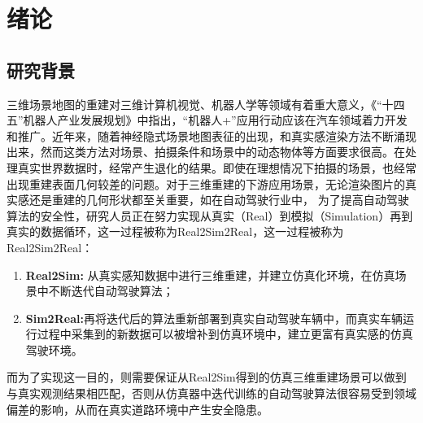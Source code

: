 %
%
%
%
%
%

\chapter{绪论}
\label{chapter:intro}

\section{研究背景}
三维场景地图的重建对三维计算机视觉、机器人学等领域有着重大意义，《“十四五”机器人产业发展规划》中指出，“机器人+”应用行动应该在汽车领域着力开发和推广。近年来，随着神经隐式场景地图表征的出现，和真实感渲染方法不断涌现出来，然而这类方法对场景、拍摄条件和场景中的动态物体等方面要求很高。在处理真实世界数据时，经常产生退化的结果。即使在理想情况下拍摄的场景，也经常出现重建表面几何较差的问题。对于三维重建的下游应用场景，无论渲染图片的真实感还是重建的几何形状都至关重要，如在自动驾驶行业中， 为了提高自动驾驶算法的安全性，研究人员正在努力实现从真实（Real）到模拟（Simulation）再到真实的数据循环，这一过程被称为Real2Sim2Real，这一过程被称为Real2Sim2Real：
\begin{enumerate}
    \item \textbf{Real2Sim:} 从真实感知数据中进行三维重建，并建立仿真化环境，在仿真场景中不断迭代自动驾驶算法；
    \item \textbf{Sim2Real:}再将迭代后的算法重新部署到真实自动驾驶车辆中，而真实车辆运行过程中采集到的新数据可以被增补到仿真环境中，建立更富有真实感的仿真驾驶环境。
\end{enumerate}

而为了实现这一目的，则需要保证从Real2Sim得到的仿真三维重建场景可以做到与真实观测结果相匹配，否则从仿真器中迭代训练的自动驾驶算法很容易受到领域偏差的影响，从而在真实道路环境中产生安全隐患。

